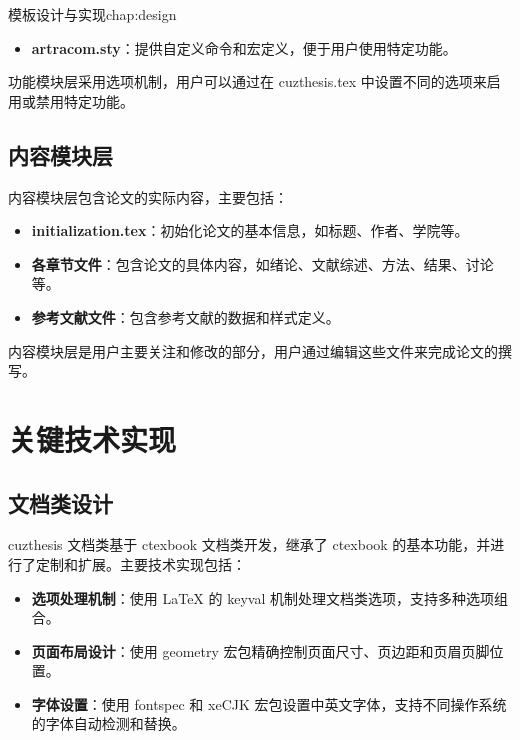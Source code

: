 \begin{cuzchapter}{模板设计与实现}{chap:design}
\begin{itemize}
        \item \textbf{artracom.sty}：提供自定义命令和宏定义，便于用户使用特定功能。
    \end{itemize}

    功能模块层采用选项机制，用户可以通过在 cuzthesis.tex 中设置不同的选项来启用或禁用特定功能。

    \subsection{内容模块层}

    内容模块层包含论文的实际内容，主要包括：

    \begin{itemize}
        \item \textbf{initialization.tex}：初始化论文的基本信息，如标题、作者、学院等。

        \item \textbf{各章节文件}：包含论文的具体内容，如绪论、文献综述、方法、结果、讨论等。

        \item \textbf{参考文献文件}：包含参考文献的数据和样式定义。
    \end{itemize}

    内容模块层是用户主要关注和修改的部分，用户通过编辑这些文件来完成论文的撰写。

    \section{关键技术实现}\label{sec:key-technologies}

    \subsection{文档类设计}

    cuzthesis 文档类基于 ctexbook 文档类开发，继承了 ctexbook 的基本功能，并进行了定制和扩展。主要技术实现包括：

    \begin{itemize}
        \item \textbf{选项处理机制}：使用 LaTeX 的 keyval 机制处理文档类选项，支持多种选项组合。

        \item \textbf{页面布局设计}：使用 geometry 宏包精确控制页面尺寸、页边距和页眉页脚位置。

        \item \textbf{字体设置}：使用 fontspec 和 xeCJK 宏包设置中英文字体，支持不同操作系统的字体自动检测和替换。


\end{itemize}
\end{cuzchapter}
